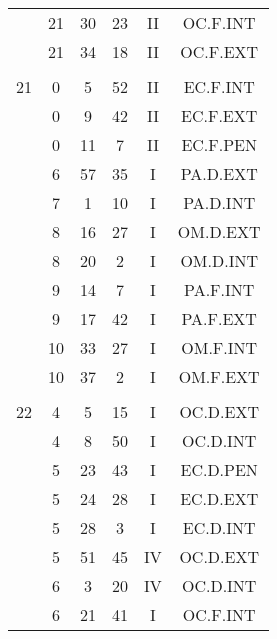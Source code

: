 \documentclass[12pt, a4paper]{article}
\begin{document}
\begin{multicols}{3}
{\begin{tabular}{c c c c c c}
	 	 	 	 & 21 & 30 & 23 & II & OC.F.INT\\%
	 	 	 	 & 21 & 34 & 18 & II & OC.F.EXT\\%
	 	 	 	 & & & & & \\%
	 	 	 	21 & 0 & 5 & 52 & II & EC.F.INT\\%
	 	 	 	 & 0 & 9 & 42 & II & EC.F.EXT\\%
	 	 	 	 & 0 & 11 & 7 & II & EC.F.PEN\\%
	 	 	 	 & 6 & 57 & 35 & I & PA.D.EXT\\%
	 	 	 	 & 7 & 1 & 10 & I & PA.D.INT\\%
	 	 	 	 & 8 & 16 & 27 & I & OM.D.EXT\\%
	 	 	 	 & 8 & 20 & 2 & I & OM.D.INT\\%
	 	 	 	 & 9 & 14 & 7 & I & PA.F.INT\\%
	 	 	 	 & 9 & 17 & 42 & I & PA.F.EXT\\%
	 	 	 	 & 10 & 33 & 27 & I & OM.F.INT\\%
	 	 	 	 & 10 & 37 & 2 & I & OM.F.EXT\\%
	 	 	 	 & & & & & \\%
	 	 	 	22 & 4 & 5 & 15 & I & OC.D.EXT\\%
	 	 	 	 & 4 & 8 & 50 & I & OC.D.INT\\%
	 	 	 	 & 5 & 23 & 43 & I & EC.D.PEN\\%
	 	 	 	 & 5 & 24 & 28 & I & EC.D.EXT\\%
	 	 	 	 & 5 & 28 & 3 & I & EC.D.INT\\%
	 	 	 	 & 5 & 51 & 45 & IV & OC.D.EXT\\%
	 	 	 	 & 6 & 3 & 20 & IV & OC.D.INT\\%
	 	 	 	 & 6 & 21 & 41 & I & OC.F.INT\\%

\end{tabular}}
\end{multicols}
\end{document}
